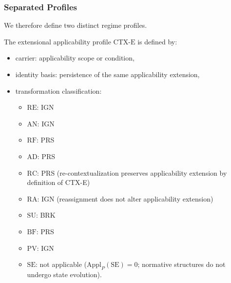 \subsubsection{Separated Profiles}

We therefore define two distinct regime profiles.

\begin{definition}
The extensional applicability profile $\mathrm{CTX\mbox{-}E}$ is defined by:
\begin{itemize}
\item carrier: applicability scope or condition,
\item identity basis: persistence of the same applicability extension,
\item transformation classification:
\begin{itemize}
  \item $\mathrm{RE}$: IGN
  \item $\mathrm{AN}$: IGN
  \item $\mathrm{RF}$: PRS
  \item $\mathrm{AD}$: PRS
  \item $\mathrm{RC}$: PRS \quad (re-contextualization preserves
        applicability extension by definition of CTX-E)
  \item $\mathrm{RA}$: IGN \quad (reassignment does not alter
        applicability extension)
  \item $\mathrm{SU}$: BRK
  \item $\mathrm{BF}$: PRS
  \item $\mathrm{PV}$: IGN
  \item $\mathrm{SE}$: not applicable
      ($\mathrm{Appl}_P(\mathrm{SE}) = 0$;
      normative structures do not undergo state evolution).
\end{itemize}
\end{itemize}
\end{definition}

